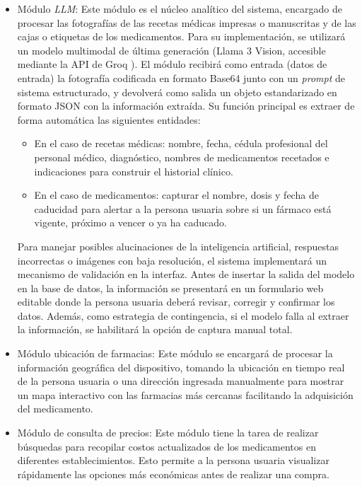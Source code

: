 \begin{itemize}
        \item Módulo \emph{LLM}: Este módulo es el núcleo analítico del sistema, encargado de procesar las fotografías de las recetas médicas impresas o manuscritas y de las cajas o etiquetas de los medicamentos. Para su implementación, se utilizará un modelo multimodal de última generación (Llama 3 Vision, accesible mediante la API de Groq \cite{CostoGroq}). El módulo recibirá como entrada (datos de entrada) la fotografía codificada en formato Base64 junto con un \emph{prompt} de sistema estructurado, y devolverá como salida un objeto estandarizado en formato JSON con la información extraída. Su función principal es extraer de forma automática las siguientes entidades:
        \begin{itemize}
            \item En el caso de recetas médicas: nombre, fecha, cédula profesional del personal médico, diagnóstico, nombres de medicamentos recetados e indicaciones para construir el historial clínico.
            \item En el caso de medicamentos: capturar el nombre, dosis y fecha de caducidad para alertar a la persona usuaria sobre si un fármaco está vigente, próximo a vencer o ya ha caducado.
        \end{itemize}
        Para manejar posibles alucinaciones de la inteligencia artificial, respuestas incorrectas o imágenes con baja resolución, el sistema implementará un mecanismo de validación en la interfaz. Antes de insertar la salida del modelo en la base de datos, la información se presentará en un formulario web editable donde la persona usuaria deberá revisar, corregir y confirmar los datos. Además, como estrategia de contingencia, si el modelo falla al extraer la información, se habilitará la opción de captura manual total.
        
        \item Módulo ubicación de farmacias: Este módulo se encargará de procesar la información geográfica del dispositivo, tomando la ubicación en tiempo real de la persona usuaria o una dirección ingresada manualmente para mostrar un mapa interactivo con las farmacias más cercanas facilitando la adquisición del medicamento.

        \item Módulo de consulta de precios: Este módulo tiene la tarea de realizar búsquedas para recopilar costos actualizados de los medicamentos en diferentes establecimientos. Esto permite a la persona usuaria visualizar rápidamente las opciones más económicas antes de realizar una compra.


\end{itemize}
